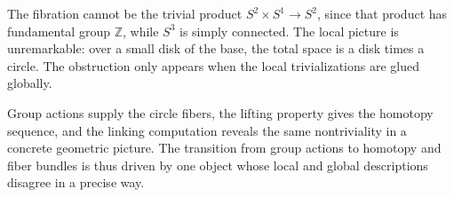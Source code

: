 The fibration cannot be the trivial product \(S^2\times S^1\to S^2\), since that product has fundamental group \(\mathbb Z\), while \(S^3\) is simply connected. The local picture is unremarkable: over a small disk of the base, the total space is a disk times a circle. The obstruction only appears when the local trivializations are glued globally.

Group actions supply the circle fibers, the lifting property gives the homotopy sequence, and the linking computation reveals the same nontriviality in a concrete geometric picture. The transition from group actions to homotopy and fiber bundles is thus driven by one object whose local and global descriptions disagree in a precise way.
